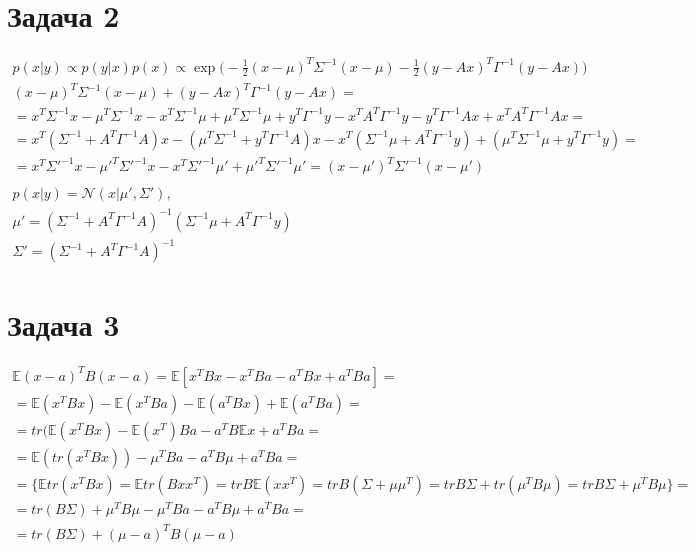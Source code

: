 \documentclass[12pt, a4paper]{article}
\begin{document}
    \section*{Задача 2}
    \begin{gather*}
        p(x|y) \propto p(y|x)p(x) \propto \exp{\Big(-\frac{1}{2}(x - \mu)^T\Sigma^{-1}(x - \mu) -\frac{1}{2}(y - Ax)^T\Gamma^{-1}(y - Ax)\Big)}\\
        (x - \mu)^T\Sigma^{-1}(x - \mu) + (y - Ax)^T\Gamma^{-1}(y - Ax) = \\
        = x^T\Sigma^{-1}x - \mu^T\Sigma^{-1}x - x^T\Sigma^{-1}\mu + \mu^T\Sigma^{-1}\mu + y^T\Gamma^{-1}y - x^TA^T\Gamma^{-1}y - y^T\Gamma^{-1}Ax + x^TA^T\Gamma^{-1}Ax=\\
        = x^T(\Sigma^{-1} + A^T\Gamma^{-1}A)x - (\mu^T\Sigma^{-1} + y^T\Gamma^{-1}A)x - x^T(\Sigma^{-1}\mu + A^T\Gamma^{-1}y) + (\mu^T\Sigma^{-1}\mu + y^T\Gamma^{-1}y)=\\
        = x^T\Sigma'^{-1}x - \mu'^T\Sigma'^{-1}x - x^T\Sigma'^{-1}\mu' + \mu'^T\Sigma'^{-1}\mu' = (x - \mu')^T\Sigma'^{-1}(x - \mu')\\
        \\
        p(x|y) = \mathcal{N}(x|\mu',\Sigma'),\\
        \mu' = (\Sigma^{-1} + A^T\Gamma^{-1}A)^{-1}(\Sigma^{-1}\mu + A^T\Gamma^{-1}y)\\ \Sigma' = (\Sigma^{-1} + A^T\Gamma^{-1}A)^{-1}
    \end{gather*}

    \section*{Задача 3}
    \begin{gather*}
        \mathbb{E}(x-a)^TB(x-a) = \mathbb{E}[x^TBx-x^TBa-a^TBx+a^TBa] = \\
        = \mathbb{E}(x^TBx) - \mathbb{E}(x^TBa) - \mathbb{E}(a^TBx) + \mathbb{E}(a^TBa) =\\
        = tr(\mathbb{E}(x^TBx) - \mathbb{E}(x^T)Ba - a^TB\mathbb{E}x + a^TBa = \\
        = \mathbb{E}(tr(x^TBx)) - \mu^T Ba - a^TB\mu + a^TBa = \\
        = \Big\{\mathbb{E}tr(x^TBx) = \mathbb{E}tr(Bxx^T) = tr B\mathbb{E}(xx^T) = tr B(\Sigma + \mu\mu^T) = tr B\Sigma + tr(\mu^TB\mu) = tr B\Sigma + \mu^TB\mu\Big\} = \\
        = tr(B\Sigma) + \mu^TB\mu - \mu^T Ba - a^TB\mu + a^TBa = \\
        = tr(B\Sigma) + (\mu - a)^TB(\mu - a)
    \end{gather*}
\end{document}
